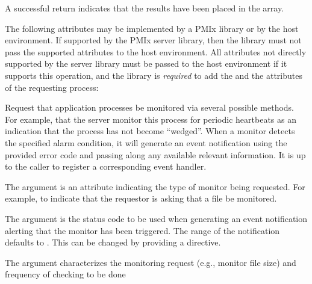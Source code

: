A successful return indicates that the results have been placed in the  array.

\returnsimple

\optattrstart
The following attributes may be implemented by a \ac{PMIx} library or by the host environment. If supported by the \ac{PMIx} server library, then the library must not pass the supported attributes to the host environment. All attributes not directly supported by the server library must be passed to the host environment if it supports this operation, and the library is \textit{required} to add the  and the  attributes of the requesting process:


\optattrend

\descr

Request that application processes be monitored via several possible methods.
For example, that the server monitor this process for periodic heartbeats as an indication that the process has not become ``wedged''.
When a monitor detects the specified alarm condition, it will generate an event notification using the provided error code and passing along any available relevant information.
It is up to the caller to register a corresponding event handler.

The  argument is an attribute indicating the type of monitor being requested.
For example,  to indicate that the requestor is asking that a file be monitored.

The  argument is the status code to be used when generating an event notification alerting that the monitor has been triggered.
The range of the notification defaults to .
This can be changed by providing a  directive.

The  argument characterizes the monitoring request (e.g., monitor file size) and frequency of checking to be done

